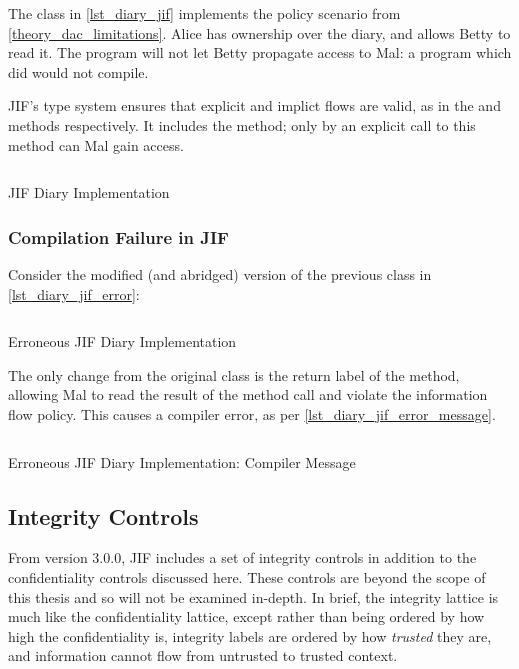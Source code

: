 The class in \autoref{lst_diary_jif} implements the policy scenario from \ref{theory_dac_limitations}. Alice has ownership over the diary, and allows Betty to read it. The program will not let Betty propagate access to Mal: a program which did would not compile.

JIF's type system ensures that explicit and implict flows are valid, as in the  and  methods respectively. It includes the  method; only by an explicit call to this method can Mal gain access.

\begin{listing}[!ht]
	\inputminted{java}{content/code_sections/jif_para_bg/Diary.jif}
	\caption{JIF Diary Implementation}
	\label{lst_diary_jif}
\end{listing}

\clearpage

\subsubsection{Compilation Failure in JIF}

Consider the modified (and abridged) version of the previous class in \autoref{lst_diary_jif_error}:

\begin{listing}[!ht]
	\inputminted{java}{content/code_sections/jif_para_bg/DiaryError.jif}
	\caption{Erroneous JIF Diary Implementation}
	\label{lst_diary_jif_error}
\end{listing}

The only change from the original  class is the return label of the  method, allowing Mal to read the result of the method call and violate the information flow policy. This causes a compiler error, as per \autoref{lst_diary_jif_error_message}.

\begin{listing}[!ht]
	\inputminted[fontsize=\footnotesize]{text}{content/code_sections/jif_para_bg/DiaryError_message_jif.txt}
	\caption{Erroneous JIF Diary Implementation: Compiler Message}
	\label{lst_diary_jif_error_message}
\end{listing}

\clearpage

\subsection{Integrity Controls}

From version 3.0.0, JIF includes a set of integrity controls in addition to the confidentiality controls discussed here. These controls are beyond the scope of this thesis and so will not be examined in-depth. In brief, the integrity lattice is much like the confidentiality lattice, except rather than being ordered by how high the confidentiality is, integrity labels are ordered by how \textit{trusted} they are, and information cannot flow from untrusted to trusted context.

